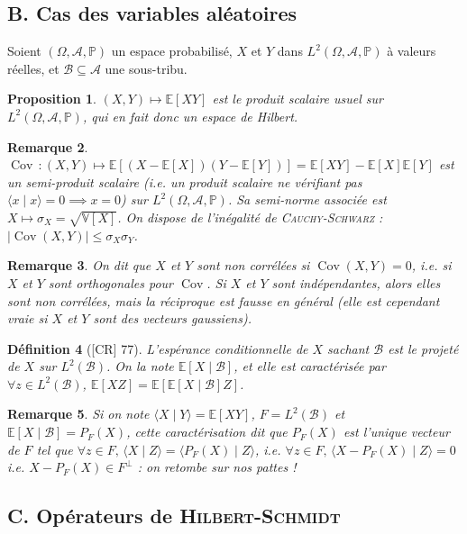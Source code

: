 \documentclass[10pt, a4paper, parskip=full, twoside, twocolumn]{report}
\newtheorem{definition}{Définition}
\newtheorem{proposition}[definition]{Proposition}
\newtheorem{remark}[definition]{Remarque}
\newcommand{\IP}{\mathbb{P}}
\newcommand{\IE}{\mathbb{E}}
\newcommand{\IV}{\mathbb{V}}
\newcommand{\B}{\mathcal{B}}
\newcommand{\A}{\mathscr{A}}
\newcommand{\ps}[2]{\langle #1\mid #2\rangle}
\DeclareMathOperator{\Cov}{Cov}
\begin{document}
\subsection*{B. Cas des variables aléatoires}

\textcolor{paragraphtext}{Soient $(\Omega, \A, \IP)$ un espace probabilisé, $X$ et $Y$ dans $L^2(\Omega, \A, \IP)$ à valeurs réelles, et $\B\subseteq \A$ une sous-tribu.}

\begin{proposition}
	$(X,Y)\mapsto \IE[XY]$ est le produit scalaire usuel sur $L^2(\Omega, \A,\IP)$, qui en fait donc un espace de Hilbert.
\end{proposition}

\begin{remark}
	$\Cov\,\colon (X,Y)\mapsto \IE\left[(X-\IE[X])(Y-\IE[Y])\right] = \IE[XY] - \IE[X]\IE[Y]$ est un semi-produit scalaire (\emph{i.e.} un produit scalaire ne vérifiant pas $\ps{x}{x} = 0 \implies x = 0$) sur $L^2(\Omega,\A,\IP)$.
	Sa semi-norme associée est $X \mapsto \sigma_X = \sqrt{\IV[X]}$. On dispose de l'inégalité de \textsc{Cauchy-Schwarz} : $\vert\Cov(X,Y)\vert \leq \sigma_X\sigma_Y$.
\end{remark}

\begin{remark}
	On dit que $X$ et $Y$ sont \emph{non corrélées} si $\Cov(X,Y) = 0$, \emph{i.e.} si $X$ et $Y$ sont orthogonales pour $\Cov$. Si $X$ et $Y$ sont indépendantes, alors elles sont non corrélées, mais la réciproque est fausse en général (elle est cependant vraie si $X$ et $Y$ sont des vecteurs gaussiens).
\end{remark}

\begin{definition}[\textnormal{[CR] 77}]
	L'\emph{espérance conditionnelle de $X$ sachant $\B$} est le projeté de $X$ sur $L^2(\B)$.
	On la note $\IE[X\mid \B]$, et elle est caractérisée par $\forall z\in L^2(\B)$, $\IE[XZ] = \IE\left[\IE[X\mid \B]Z\right]$.
\end{definition}

\begin{remark}
	Si on note $\ps{X}{Y}=\IE[XY]$, $F = L^2(\B)$ et $\IE[X\mid \B]=P_F(X)$, cette caractérisation dit que $P_F(X)$ est l'unique vecteur de $F$ tel que $\forall z\in F,\, \ps{X}{Z} = \ps{P_F(X)}{Z}$, \emph{i.e.} $\forall z\in F,\, \ps{X-P_F(X)}{Z}=0$ \emph{i.e.} $X -P_F(X)\in F^{\perp}$ : on retombe sur nos pattes !
\end{remark}

\subsection*{C. Opérateurs de \textsc{Hilbert-Schmidt}}
\end{document}
